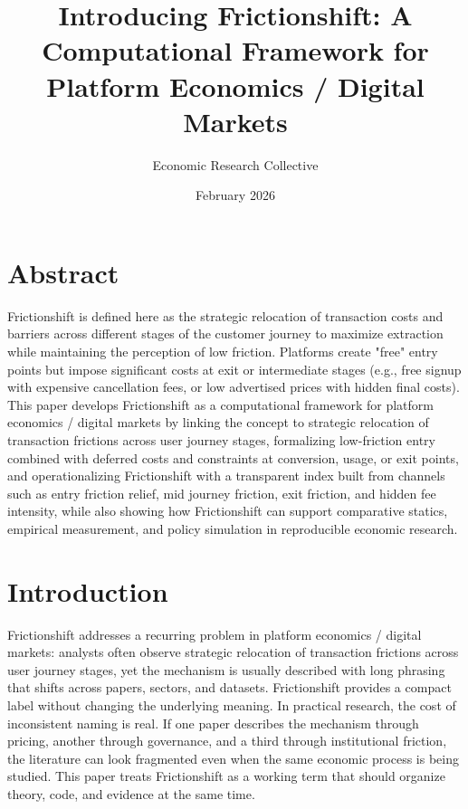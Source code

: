 \documentclass[12pt]{article}
\title{Introducing Frictionshift: A Computational Framework for Platform Economics / Digital Markets}
\author{Economic Research Collective}
\date{February 2026}
\begin{document}
\maketitle

\section*{Abstract}
Frictionshift is defined here as the strategic relocation of transaction costs and barriers across different stages of the customer journey to maximize extraction while maintaining the perception of low friction. Platforms create "free" entry points but impose significant costs at exit or intermediate stages (e.g., free signup with expensive cancellation fees, or low advertised prices with hidden final costs). This paper develops Frictionshift as a computational framework for platform economics / digital markets by linking the concept to strategic relocation of transaction frictions across user journey stages, formalizing low-friction entry combined with deferred costs and constraints at conversion, usage, or exit points, and operationalizing Frictionshift with a transparent index built from channels such as entry friction relief, mid journey friction, exit friction, and hidden fee intensity, while also showing how Frictionshift can support comparative statics, empirical measurement, and policy simulation in reproducible economic research.

\section{Introduction}
Frictionshift addresses a recurring problem in platform economics / digital markets: analysts often observe strategic relocation of transaction frictions across user journey stages, yet the mechanism is usually described with long phrasing that shifts across papers, sectors, and datasets. Frictionshift provides a compact label without changing the underlying meaning. In practical research, the cost of inconsistent naming is real. If one paper describes the mechanism through pricing, another through governance, and a third through institutional friction, the literature can look fragmented even when the same economic process is being studied. This paper treats Frictionshift as a working term that should organize theory, code, and evidence at the same time.
\end{document}
